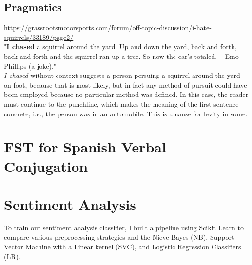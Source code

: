 \documentclass{amsart}
\theoremstyle{definition}
\theoremstyle{remark}
\numberwithin{equation}{section}
\begin{document}
\subsection{Pragmatics}

\url{https://grassrootsmotorsports.com/forum/off-topic-discussion/i-hate-squirrels/33189/page2/} \\

"\textbf{I chased} a squirrel around the yard. Up and down the yard, back and forth, back and forth and the squirrel ran up a tree. So now the car's totaled. -- Emo Phillips (a joke)." \\

\textit{I chased} without context suggests a person persuing a squirrel around the yard on foot, because that is most likely, but in fact any method of pursuit could have been employed because no particular method was defined. In this case, the reader must continue to the punchline, which makes the meaning of the first sentence concrete, i.e., the person was in an automobile. This is a cause for levity in some. \\


\section{FST for Spanish Verbal Conjugation}
    \begin{table}[ht]
    \centering
\end{table}

\section{Sentiment Analysis}

To train our sentiment analysis classifier, I built a pipeline using Scikit
Learn to compare various preprocessing strategies and the Nieve Bayes (NB),
Support Vector Machine with a Linear kernel (SVC), and Logistic Regression
Classifiers (LR). \\
\end{document}
